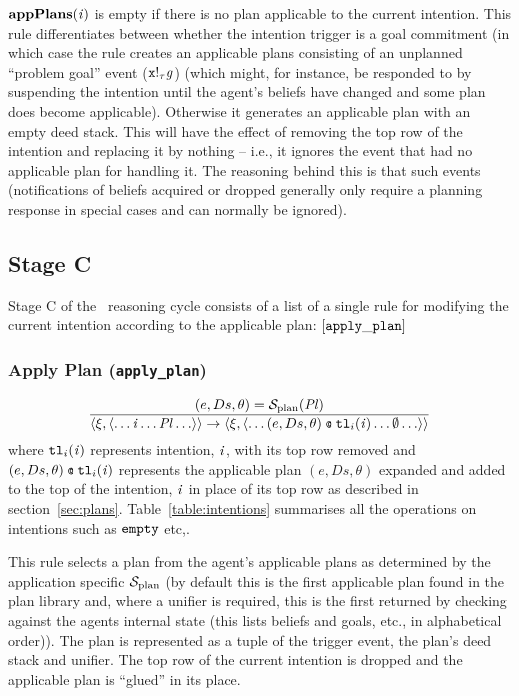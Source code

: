 $\mathbf{appPlans}(\mathit{i})$ is empty if there is no plan applicable to the current intention.  This rule differentiates between whether the intention trigger is a goal commitment (in which case the rule creates an applicable plans consisting of an unplanned ``problem goal'' event ($\mathit{\mathtt{x}!_{\tau}\mathit{g}}$) (which might, for instance, be responded to by suspending the intention until the agent's beliefs have changed and some plan does become applicable).  Otherwise it generates an applicable plan with an empty deed stack.  This will have the effect of removing the top row of the intention and replacing it by nothing -- i.e., it ignores the event that had no applicable plan for handling it.  The reasoning behind this is that such events (notifications of beliefs acquired or dropped generally only require a planning response in special cases and can normally be ignored).


\subsection{Stage C}

Stage C of the \gwendolen\ reasoning cycle consists of a list of a single rule for modifying the current intention according to the applicable plan: $[ {\tt apply\_plan} ]$

\subsubsection*{Apply Plan ({\tt apply\_plan})}

\begin{equation}
\frac{
( e, Ds, \theta )  = \AILselectplan(\AILappplans)
}
{\langle \xi, \langle \ldots \AILintention \ldots \AILappplans \ldots \rangle \rangle
\rightarrow
\langle \xi, \langle \ldots (e, Ds, \theta) \AILconcat \INTtl(\AILintention) \ldots
\emptyset \ldots \rangle \rangle
}
\end{equation}
where ${\tt tl}_i(\mathit{i})$ represents intention, $\mathit{i}$, with its top row removed and $(e, Ds, \theta) \AILconcat \INTtl(\AILintention)$ represents the applicable plan $(e, Ds, \theta)$ expanded and added to the top of the intention, $\mathit{i}$ in place of  its top row as described in section~\ref{sec:plans}.
Table~\ref{table:intentions} summarises all the operations on intentions such as ${\tt empty}$ etc,.

This rule selects a plan from the agent's
applicable plans as determined by the application specific $\mathcal{S}_{\mathrm{plan}}$ (by default this is the first applicable plan found in the plan library and, where a unifier is required, this is the first returned by checking against the agents internal state (this lists beliefs and goals, etc., in alphabetical order)).  The plan is represented as a tuple of the trigger event, the plan's deed
stack and unifier.  The top row of the current intention is dropped and the 
applicable plan is ``glued'' in its place.

